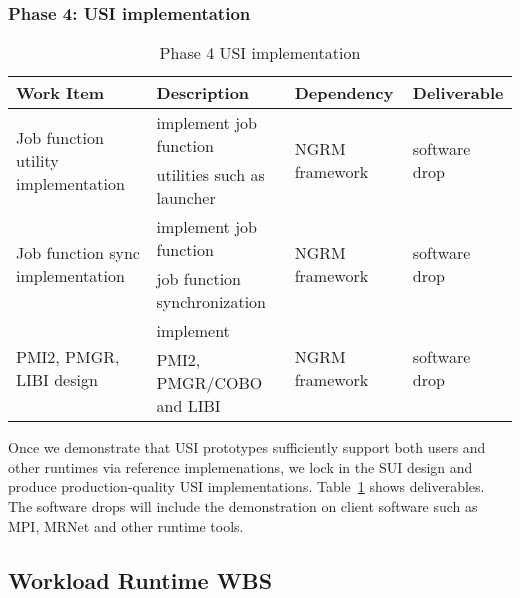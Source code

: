\subsubsection{Phase 4: USI implementation}
\begin{table}
\centering
\begin{tabular}{|l|l|l|l|}
\hline
Work Item & Description & Dependency & Deliverable \\
\hline
\multirow{2}{*}{Job function utility implementation} & implement job function& \multirow{2}{*}{NGRM framework} & \multirow{2}{*}{software drop} \\
& utilities such as launcher & & \\ \hline
\multirow{2}{*}{Job function sync implementation} & implement job function& \multirow{2}{*}{NGRM framework} & \multirow{2}{*}{software drop} \\
& job function synchronization & & \\ \hline
\multirow{2}{*}{PMI2, PMGR, LIBI design} & implement & \multirow{2}{*}{NGRM framework} & \multirow{2}{*}{software drop} \\
& PMI2, PMGR/COBO and LIBI & & \\ \hline
\end{tabular}
\caption{Phase 4 USI implementation}
\label{tab:phase4}
\end{table}

Once we demonstrate that USI prototypes sufficiently support both users and
other runtimes via reference implemenations, we lock in the SUI design and
produce production-quality USI implementations. Table~\ref{tab:phase4} shows
deliverables. The software drops will include the demonstration on client
software such as MPI, MRNet and other runtime tools.

\ifwbs
\newpage
\subsection{Workload Runtime WBS}

